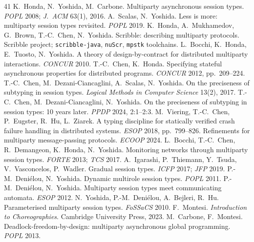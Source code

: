 \documentclass{article}
\begin{document}
\begin{thebibliography}{41}\small
{} K.~Honda, N.~Yoshida, M.~Carbone. Multiparty asynchronous session types. \emph{POPL} 2008; \emph{J.~ACM} 63(1), 2016.
 A.~Scalas, N.~Yoshida. Less is more: multiparty session types revisited. \emph{POPL} 2019.
 K.~Honda, A.~Mukhamedov, G.~Brown, T.-C.~Chen, N.~Yoshida. Scribble: describing multiparty protocols. Scribble project; \texttt{scribble-java}, \texttt{nuScr}, \texttt{mpstk} toolchains.
 L.~Bocchi, K.~Honda, E.~Tuosto, N.~Yoshida. A theory of design-by-contract for distributed multiparty interactions. \emph{CONCUR} 2010.
 T.-C.~Chen, K.~Honda. Specifying stateful asynchronous properties for distributed programs. \emph{CONCUR} 2012, pp.~209--224.
 T.-C.~Chen, M.~Dezani-Ciancaglini, A.~Scalas, N.~Yoshida. On the preciseness of subtyping in session types. \emph{Logical Methods in Computer Science} 13(2), 2017.
 T.-C.~Chen, M.~Dezani-Ciancaglini, N.~Yoshida. On the preciseness of subtyping in session types: 10 years later. \emph{PPDP} 2024, 2:1--2:3.
 M.~Viering, T.-C.~Chen, P.~Eugster, R.~Hu, L.~Ziarek. A typing discipline for statically verified crash failure handling in distributed systems. \emph{ESOP} 2018, pp.~799--826.
 Refinements for multiparty message-passing protocols. \emph{ECOOP} 2024.
 L.~Bocchi, T.-C.~Chen, R.~Demangeon, K.~Honda, N.~Yoshida. Monitoring networks through multiparty session types. \emph{FORTE} 2013; \emph{TCS} 2017.
 A.~Igarashi, P.~Thiemann, Y.~Tsuda, V.~Vasconcelos, P.~Wadler. Gradual session types. \emph{ICFP} 2017; \emph{JFP} 2019.
 P.-M.~Deni\'elou, N.~Yoshida. Dynamic multirole session types. \emph{POPL} 2011.
 P.-M.~Deni\'elou, N.~Yoshida. Multiparty session types meet communicating automata. \emph{ESOP} 2012.
 N.~Yoshida, P.-M.~Deni\'elou, A.~Bejleri, R.~Hu. Parameterised multiparty session types. \emph{FoSSaCS} 2010.
 F.~Montesi. \emph{Introduction to Choreographies}. Cambridge University Press, 2023.
 M.~Carbone, F.~Montesi. Deadlock-freedom-by-design: multiparty asynchronous global programming. \emph{POPL} 2013.

\end{thebibliography}
\end{document}
